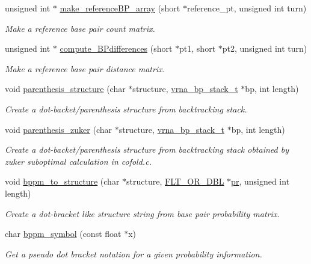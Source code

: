 \begin{DoxyCompactItemize}
unsigned int $\ast$ \hyperlink{group__struct__utils__deprecated_ga578cd9712dee812fb1c58aa3cc489864}{make\+\_\+reference\+B\+P\+\_\+array} (short $\ast$reference\+\_\+pt, unsigned int turn)
\begin{DoxyCompactList}\small\item\em Make a reference base pair count matrix. \end{DoxyCompactList}\item 
unsigned int $\ast$ \hyperlink{group__struct__utils__deprecated_gadd463184355d0803b6ee6e09f29182f2}{compute\+\_\+\+B\+Pdifferences} (short $\ast$pt1, short $\ast$pt2, unsigned int turn)
\begin{DoxyCompactList}\small\item\em Make a reference base pair distance matrix. \end{DoxyCompactList}\item 
void \hyperlink{group__struct__utils__deprecated_gadf0ad2d46c9ca7b850437d1b79627a7e}{parenthesis\+\_\+structure} (char $\ast$structure, \hyperlink{group__data__structures_gaa651bda42e7692f08cb603cd6834b0ee}{vrna\+\_\+bp\+\_\+stack\+\_\+t} $\ast$bp, int length)
\begin{DoxyCompactList}\small\item\em Create a dot-\/backet/parenthesis structure from backtracking stack. \end{DoxyCompactList}\item 
void \hyperlink{group__struct__utils__deprecated_gab9c5c8311bd5120900585d4fa50c2df0}{parenthesis\+\_\+zuker} (char $\ast$structure, \hyperlink{group__data__structures_gaa651bda42e7692f08cb603cd6834b0ee}{vrna\+\_\+bp\+\_\+stack\+\_\+t} $\ast$bp, int length)
\begin{DoxyCompactList}\small\item\em Create a dot-\/backet/parenthesis structure from backtracking stack obtained by zuker suboptimal calculation in cofold.\+c. \end{DoxyCompactList}\item 
void \hyperlink{group__struct__utils__deprecated_ga129d81c4a1ead793c5b2311333e03dfa}{bppm\+\_\+to\+\_\+structure} (char $\ast$structure, \hyperlink{group__data__structures_ga31125aeace516926bf7f251f759b6126}{F\+L\+T\+\_\+\+O\+R\+\_\+\+D\+BL} $\ast$\hyperlink{fold__vars_8h_ac98ec419070aee6831b44e5c700f090f}{pr}, unsigned int length)
\begin{DoxyCompactList}\small\item\em Create a dot-\/bracket like structure string from base pair probability matrix. \end{DoxyCompactList}\item 
char \hyperlink{group__struct__utils__deprecated_ga49962ad6242b8c628de6ca16bb831c1d}{bppm\+\_\+symbol} (const float $\ast$x)
\begin{DoxyCompactList}\small\item\em Get a pseudo dot bracket notation for a given probability information. \end{DoxyCompactList}\end{DoxyCompactItemize}
